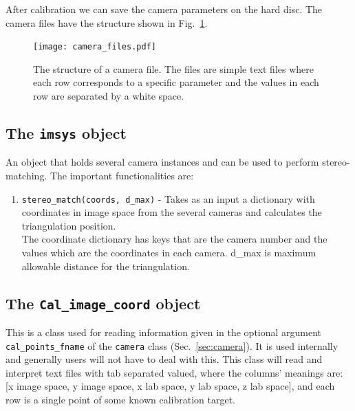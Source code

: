 \documentclass[10pt,a4paper]{article}
\begin{document}
After calibration we can save the camera parameters on the hard disc. The camera files have the structure shown in Fig.~\ref{fig:camfiles}.

\begin{figure}[!ht]
	\centering
	\texttt{[image: camera\_files.pdf]}
	\caption{The structure of a camera file. The files are simple text files where each row corresponds to a specific parameter and the values in each row are separated by a white space. \label{fig:camfiles}}
\end{figure}








\subsection{The \texttt{imsys} object}


An object that holds several camera instances and can be used to perform stereo-matching. The important functionalities are:


\begin{enumerate}
	\item \texttt{stereo\_match(coords, d\_max)} - Takes as an input a dictionary with coordinates in image space from the several cameras and calculates the triangulation position. \\ The coordinate dictionary has keys that are the camera number and the values which are the coordinates in each camera. d\_max is maximum allowable distance for the triangulation.
	
\end{enumerate}








\subsection{The \texttt{Cal\_image\_coord} object}\label{sec:calpointreader}

This is a class used for reading information given in the optional argument \texttt{cal\_points\_fname} of the \texttt{camera} class (Sec.~\ref{sec:camera}). It is used internally and generally users will not have to deal with this. This class will read and interpret text files with tab separated valued, where the columns' meanings are: [x image space, y image space, x lab space, y lab space, z lab space], and each row is a single point of some known calibration target.
\end{document}
